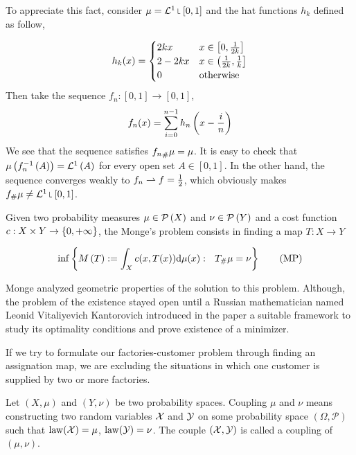 To appreciate this fact, consider $\mu = \Lebesgue^1\measurerestr[0,1]$ and the hat functions $h_k$ defined as follow,

\begin{equation*}
	h_k(x)=\begin{cases}
		2kx & x\in\left[ 0, \frac{1}{2k} \right]\\
		2-2kx & x\in \left(\frac{1}{2k}, \frac{1}{k}\right] \\
		0 & \text{otherwise}
	\end{cases}
\end{equation*}
Then take the sequence $f_n:[0,1]\rightarrow [0,1]$,
\begin{equation}
	f_n(x)=\sum_{i=0}^{n-1}h_n\left( x-\frac{i}{n} \right)
\end{equation}
We see that the sequence satisfies ${f_{n}}_{\#} \mu=\mu$. It is easy to check that $\mu\left( f_n^{-1}\left(A\right) \right)=\mathcal{L}^1\left( A \right)$ for every open set $A\in [0,1]$. In the other hand, the sequence converges weakly to $f_n\rightharpoonup f=\frac{1}{2}$, which obviously makes $\Tmeasure{\mu}{f}\neq\Lebesgue^1\measurerestr [0,1]$. 


\begin{problem} Given two probability measures $\mu \in \mathcal{P}\left( X \right)$ and $\nu \in \mathcal{P}\left( Y \right)$ and a cost function $c: X \times Y \rightarrow \left\lbrace 0, +\infty \right\rbrace$, the Monge's problem consists in finding a map $T:X\rightarrow Y$
	
\begin{equation}
\inf\left\lbrace M\left(T\right):=\int_X c(x, T(x)) \mathrm{d} \mu(x): \ \ {T}_{\#} \mu=\nu  \right\rbrace\label{eq: Monge's Problem.}\tag{MP}
\end{equation}
\end{problem}

Monge analyzed geometric properties of the solution to this problem. Although, the problem of the existence stayed open until a Russian mathematician named Leonid Vitaliyevich Kantorovich introduced in the paper \cite{Kantorovich1942} a suitable framework to study its optimality conditions and prove existence of a minimizer. 

If we try to formulate our factories-customer problem through finding an assignation map, we are excluding the situations in which one customer is supplied by two or more factories.

\begin{definition}[Coupling] Let $(X, \mu)$ and $(Y, \nu)$ be two probability spaces. Coupling $\mu$ and $\nu$ means constructing two random variables $\mathcal{X}$ and $\mathcal{Y}$ on some probability space $(\Omega, \mathcal{P})$ such that $\mathrm{law}(\mathcal{X})=\mu$, $\mathrm{law}(\mathcal{Y})=\nu$. The couple $(\mathcal{X},\mathcal{Y})$ is called a coupling of $(\mu, \nu)$.  
\end{definition}




